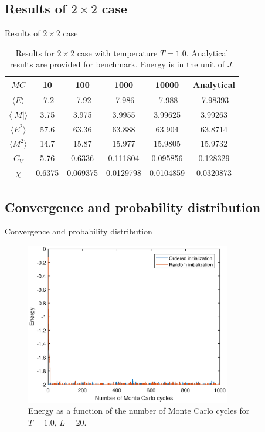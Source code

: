 \documentclass{beamer}
\begin{document}
\subsection{Results of $2 \times 2$ case}
\begin{frame}{Results of $2 \times 2$ case}
\begin{table}
	\centering
	\caption{Results for $2\times2$ case with temperature $T=1.0$. Analytical results are provided for benchmark. 
		Energy is in the unit of $J$. }
	\begin{tabular}{cccccc}
		\hline
		\hline
		$MC$ & 10 & 100 & 1000 & 10000 & Analytical \\ 
		\hline
		$\langle E \rangle$ & -7.2 & -7.92 & -7.986 & -7.988 & -7.98393\\ 
		$\langle |M| \rangle$ & 3.75 & 3.975 & 3.9955 & 3.99625 & 3.99263\\ 
		$\langle E^2 \rangle$ & 57.6  & 63.36 & 63.888 & 63.904 & 63.8714\\ 
		$\langle M^2 \rangle$ & 14.7 & 15.87 & 15.977 & 15.9805 & 15.9732\\ 
		$C_V$ & 5.76 & 0.6336 & 0.111804 & 0.095856 & 0.128329\\ 
		$\chi$ & 0.6375 & 0.069375 & 0.0129798 & 0.0104859 & 0.0320873\\ 
		\hline
		\hline 
	\end{tabular} 
	\label{tab:2times2result}
\end{table}
\end{frame}

\subsection{Convergence and probability distribution}
\begin{frame}{Convergence and probability distribution}
\begin{figure}
	\includegraphics[width=0.8\textwidth]{Process_ene_lowT.eps}
	\caption{Energy as a function of the number of Monte Carlo cycles for $T=1.0$, $L=20$. }
\end{figure}
\end{frame}
\end{document}
